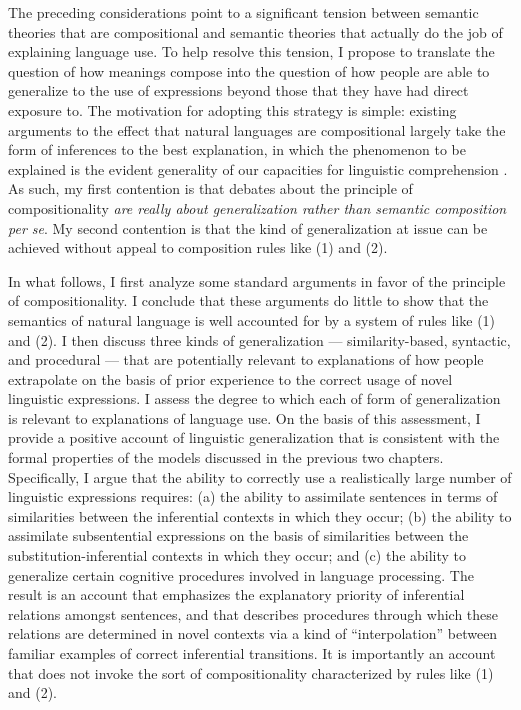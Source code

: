 The preceding considerations point to a significant tension between semantic theories that are compositional and semantic theories that actually do the job of explaining language use. To help resolve this tension, I propose to translate the question of how meanings compose into the question of how people are able to generalize to the use of expressions beyond those that they have had direct exposure to. The motivation for adopting this strategy is simple: existing arguments to the effect that natural languages are compositional largely take the form of inferences to the best explanation, in which the phenomenon to be explained is the evident generality of our capacities for linguistic comprehension \citep{Szabo:2013,Szabo:2012}. As such, my first contention is that debates about the principle of compositionality \textit{are really about generalization rather than semantic composition per se}. My second contention is that the kind of generalization at issue can be achieved without appeal to composition rules like (1) and (2). 

In what follows, I first analyze some standard arguments in favor of the principle of compositionality. I conclude that these arguments do little to show that the semantics of natural language is well accounted for by a system of rules like (1) and (2). I then discuss three kinds of generalization --- similarity-based, syntactic, and procedural --- that are potentially relevant to explanations of how people extrapolate on the basis of prior experience to the correct usage of novel linguistic expressions. I assess the degree to which each of form of generalization is relevant to explanations of language use. On the basis of this assessment, I provide a positive account of linguistic generalization that is consistent with the formal properties of the models discussed in the previous two chapters. Specifically, I argue that the ability to correctly use a realistically large number of linguistic expressions requires: (a) the ability to assimilate sentences in terms of similarities between the inferential contexts in which they occur; (b) the ability to assimilate subsentential expressions on the basis of similarities between the substitution-inferential contexts in which they occur; and (c) the ability to generalize certain cognitive procedures involved in language processing. The result is an account that emphasizes the explanatory priority of inferential relations amongst sentences, and that describes procedures through which these relations are determined in novel contexts via a kind of ``interpolation'' between familiar examples of correct inferential transitions. It is importantly an account that does not invoke the sort of compositionality characterized by rules like (1) and (2). 

